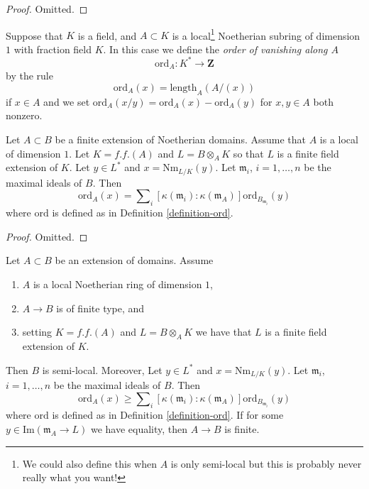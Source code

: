 \begin{proof}
Omitted.
\end{proof}

\begin{definition}
\label{definition-ord}
Suppose that $K$ is a field, and $A \subset K$ is a
local\footnote{We could also define this when $A$ is only
semi-local but this is probably never really what you want!}
Noetherian subring of dimension $1$ with fraction field $K$.
In this case we define the {\it order of vanishing along $A$}
$$
\text{ord}_A : K^* \longrightarrow \mathbf{Z}
$$
by the rule
$$
\text{ord}_A(x) = \text{length}_A(A/(x))
$$
if $x \in A$ and we set
$\text{ord}_A(x/y) = \text{ord}_A(x) - \text{ord}_A(y)$
for $x, y \in A$ both nonzero.
\end{definition}

\begin{lemma}
\label{lemma-finite-extension-dim-1}
Let $A \subset B$ be a finite extension of Noetherian domains.
Assume that $A$ is a local of dimension $1$.
Let $K = f.f.(A)$ and $L = B \otimes_A K$ so that $L$ is
a finite field extension of $K$.
Let $y \in L^*$ and $x = \text{Nm}_{L/K}(y)$.
Let $\mathfrak m_i$, $i = 1, \ldots, n$ be the maximal ideals of $B$.
Then
$$
\text{ord}_A(x) =
\sum\nolimits_i
[\kappa(\mathfrak m_i) : \kappa(\mathfrak m_A)]
\text{ord}_{B_{\mathfrak m_i}}(y)
$$
where $\text{ord}$ is defined as in Definition \ref{definition-ord}.
\end{lemma}

\begin{proof}
Omitted.
\end{proof}

\begin{lemma}
\label{lemma-quasi-finite-extension-dim-1}
Let $A \subset B$ be an extension of domains.
Assume
\begin{enumerate}
\item $A$ is a local Noetherian ring of dimension $1$,
\item $A \to B$ is of finite type, and
\item setting $K = f.f.(A)$ and $L = B \otimes_A K$
we have that $L$ is a finite field extension of $K$.
\end{enumerate}
Then $B$ is semi-local. Moreover, Let $y \in L^*$ and
$x = \text{Nm}_{L/K}(y)$. Let $\mathfrak m_i$, $i = 1, \ldots, n$
be the maximal ideals of $B$. Then
$$
\text{ord}_A(x)
\geq
\sum\nolimits_i
[\kappa(\mathfrak m_i) : \kappa(\mathfrak m_A)]
\text{ord}_{B_{\mathfrak m_i}}(y)
$$
where $\text{ord}$ is defined as in Definition \ref{definition-ord}.
If for some $y \in \text{Im}(\mathfrak m_A \to L)$ we have equality,
then $A \to B$ is finite.
\end{lemma}


